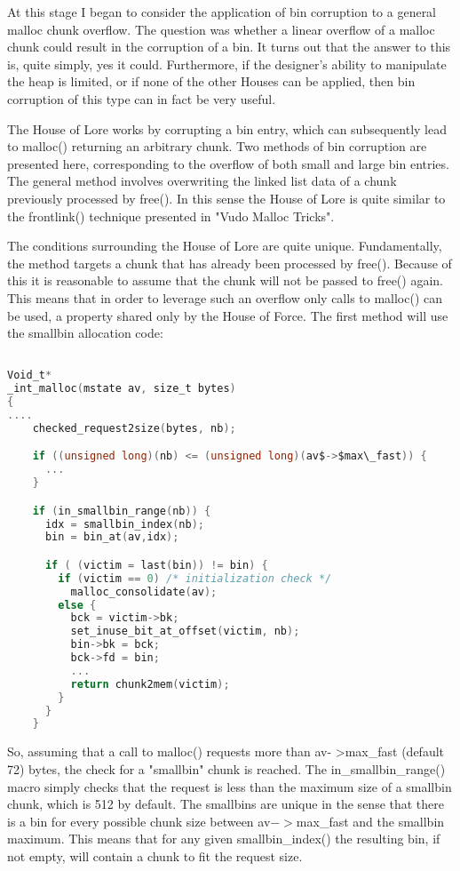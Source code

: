 \documentclass[12pt]{article}
\begin{document}
At this stage I began to consider the application of bin corruption
to a general malloc chunk overflow. The question was whether a
linear overflow of a malloc chunk could result in the corruption of
a bin. It turns out that the answer to this is, quite simply, yes
it could. Furthermore, if the designer's ability to manipulate the
heap is limited, or if none of the other Houses can be applied,
then bin corruption of this type can in fact be very useful.
\newline


The House of Lore works by corrupting a bin entry, which can
subsequently lead to malloc() returning an arbitrary chunk. Two
methods of bin corruption are presented here, corresponding to the
overflow of both small and large bin entries. The general method
involves overwriting the linked list data of a chunk previously
processed by free(). In this sense the House of Lore is quite
similar to the frontlink() technique presented in "Vudo Malloc
Tricks".
\newline


The conditions surrounding the House of Lore are quite unique.
Fundamentally, the method targets a chunk that has already been
processed by free(). Because of this it is reasonable to assume
that the chunk will not be passed to free() again. This means that
in order to leverage such an overflow only calls to malloc() can be
used, a property shared only by the House of Force. The first
method will use the smallbin allocation code:
\begin{lstlisting}[language=C]

Void_t*
_int_malloc(mstate av, size_t bytes)
{
....
    checked_request2size(bytes, nb);

    if ((unsigned long)(nb) <= (unsigned long)(av$->$max\_fast)) {
      ...
    }

    if (in_smallbin_range(nb)) {
      idx = smallbin_index(nb);
      bin = bin_at(av,idx);

      if ( (victim = last(bin)) != bin) {
        if (victim == 0) /* initialization check */
          malloc_consolidate(av);
        else {
          bck = victim->bk;
          set_inuse_bit_at_offset(victim, nb);
          bin->bk = bck;
          bck->fd = bin;
          ...
          return chunk2mem(victim);
        }
      }
    }
\end{lstlisting}
So, assuming that a call to malloc() requests more than av-
>max\_fast (default 72) bytes, the check for a "smallbin" chunk is
reached. The in_smallbin_range() macro simply checks that the
request is less than the maximum size of a smallbin chunk, which is
512 by default. The smallbins are unique in the sense that there is
a bin for every possible chunk size between av$->$max\_fast and the
smallbin maximum. This means that for any given smallbin_index()
the resulting bin, if not empty, will contain a chunk to fit the
request size.
\newline
\end{document}
